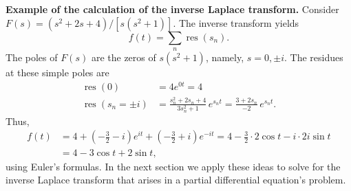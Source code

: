 \textbf{Example of the calculation of the inverse Laplace transform.}
Consider $F(s) = (s^2+2s+4)/[s(s^2+1)]$.  The inverse transform yields
\[
f(t) = \sum_n \operatorname{res}(s_n).
\]
The poles of $F(s)$ are the zeros of $s(s^2+1)$, namely, $s = 0, \pm i$.  The residues at these simple poles are
\begin{align*}
\operatorname{res}(0) &= 4e^{0t} = 4 \\
\operatorname{res}(s_n = \pm i) &= \frac{s_n^2+2s_n+4}{3s_n^2+1}\,e^{s_n t}
= \frac{3+2s_n}{-2}\,e^{s_n t}.
\end{align*}
Thus,
\begin{align*}
f(t) &= 4 + \left(-\tfrac{3}{2} - i\right)e^{it}
       + \left(-\tfrac{3}{2} + i\right)e^{-it}
     = 4 - \tfrac{3}{2}\cdot 2\cos t - i\cdot 2i\sin t \\
     &= 4 - 3\cos t + 2\sin t,
\end{align*}
using Euler's formulas.  In the next section we apply these ideas to solve for the inverse Laplace transform that arises in a partial differential equation's problem.


